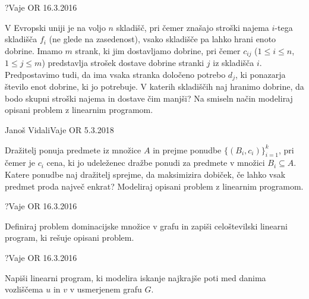 \begin{naloga}{?}{Vaje OR 16.3.2016}
\begin{vprasanje}
V Evropski uniji je na voljo $n$ skladišč,
pri čemer znašajo stroški najema $i$-tega skladišča $f_i$
(ne glede na zasedenost),
vsako skladišče pa lahko hrani enoto dobrine.
Imamo $m$ strank, ki jim dostavljamo dobrine,
pri čemer $c_{ij}$ ($1 \le i \le n$, $1 \le j \le m$)
predstavlja strošek dostave dobrine stranki $j$ iz skladišča $i$.
Predpostavimo tudi, da ima vsaka stranka določeno potrebo $d_j$,
ki ponazarja število enot dobrine, ki jo potrebuje.
V katerih skladiščih naj hranimo dobrine,
da bodo skupni stroški najema in dostave čim manjši?
Na smiseln način modeliraj opisani problem z linearnim programom.
\end{vprasanje}
\begin{odgovor}
\end{odgovor}
\end{naloga}


\begin{naloga}{Janoš Vidali}{Vaje OR 5.3.2018}
\begin{vprasanje}
Dražitelj ponuja predmete iz množice $A$
in prejme ponudbe $\{(B_i, c_i)\}_{i=1}^k$,
pri čemer je $c_i$ cena,
ki jo udeleženec dražbe ponudi za predmete v množici $B_i \subseteq A$.
Katere ponudbe naj dražitelj sprejme,
da maksimizira dobiček,
če lahko vsak predmet proda največ enkrat?
Modeliraj opisani problem z linearnim programom.
\end{vprasanje}
\begin{odgovor}
\end{odgovor}
\end{naloga}


\begin{naloga}{?}{Vaje OR 16.3.2016}
\begin{vprasanje}
Definiraj problem dominacijske množice v grafu
in zapiši celoštevilski linearni program,
ki rešuje opisani problem.
\end{vprasanje}
\begin{odgovor}
\end{odgovor}
\end{naloga}


\begin{naloga}{?}{Vaje OR 16.3.2016}
\begin{vprasanje}
Napiši linearni program,
ki modelira iskanje najkrajše poti
med danima vozliščema $u$ in $v$ v usmerjenem grafu $G$.
\end{vprasanje}
\begin{odgovor}
\end{odgovor}
\end{naloga}


